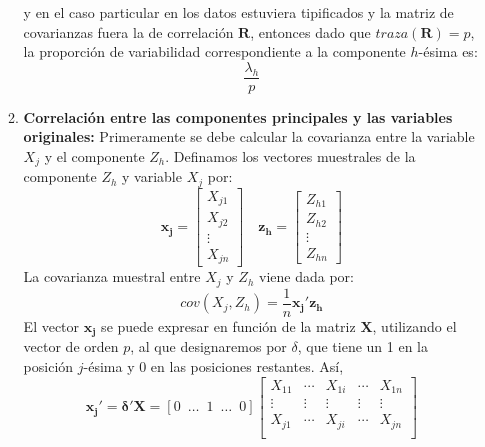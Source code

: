 \begin{enumerate}
\begin{enumerate}
        y en el caso particular en los datos estuviera tipificados y la matriz de covarianzas fuera la de correlación $\mathbf{R}$, entonces dado que $traza(\mathbf{R})=p$, la proporción de variabilidad correspondiente a la componente $h$-\'esima es:
        \begin{equation}
            \frac{\lambda_h}{p}
        \end{equation}
        \item \textbf{Correlación entre las componentes principales y las variables originales:} Primeramente se debe calcular la covarianza entre la variable $X_j$ y el componente $Z_h$. Definamos los vectores muestrales de la componente $Z_h$ y variable $X_j$ por:
        \begin{equation}
            \mathbf{x_j}=
            \begin{bmatrix}
            X_{j1} \\
            X_{j2} \\
            \vdots \\
            X_{jn}
            \end{bmatrix}
            \quad
            \mathbf{z_h}=
            \begin{bmatrix}
            Z_{h1} \\
            Z_{h2} \\
            \vdots \\
            Z_{hn}
            \end{bmatrix}
        \end{equation}
        La covarianza muestral entre $X_j$ y $Z_h$ viene dada por:
        \begin{equation}
            cov(X_j,Z_h)=\frac{1}{n}\mathbf{x_j'z_h}
            \label{eq:covarianzas}
        \end{equation}
        El vector $\mathbf{x_j}$ se puede expresar en función de la matriz $\mathbf{X}$, utilizando el vector de orden $p$, al que designaremos por $\delta$, que tiene un 1 en la posición $j$-\'esima y 0 en las posiciones restantes. Así,
        \begin{equation}
            \mathbf{x_j'}=\mathbf{\delta'X}=\left[0\enspace \ldots \enspace 1\enspace \ldots \enspace 0 \right]
            \begin{bmatrix}
            X_{11} & \cdots & X_{1i} & \cdots & X_{1n} \\
            \vdots & \vdots & \vdots & \vdots & \vdots \\
            X_{j1} & \cdots & X_{ji} & \cdots & X_{jn} \\

\end{bmatrix}
\end{equation}
\end{enumerate}
\end{enumerate}
